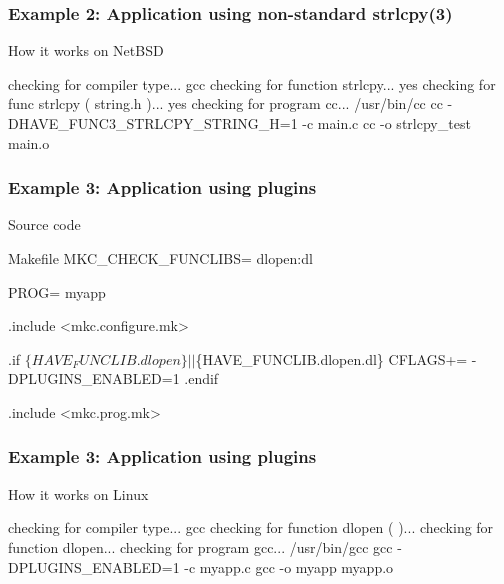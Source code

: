 \documentclass[hyperref={colorlinks=true}]{beamer}
\begin{document}
\begin{frame}[fragile]
  \frametitle{Example 2: Application using non-standard strlcpy(3)}

  \begin{block}{How it works on NetBSD}
\begin{CodeNoLabel}
checking for compiler type... gcc
checking for function strlcpy... yes
checking for func strlcpy ( string.h )... yes
checking for program cc... /usr/bin/cc
cc  -DHAVE_FUNC3_STRLCPY_STRING_H=1    -c main.c
cc   -o strlcpy_test main.o
\prompt{\$} 
\end{CodeNoLabel}
  \end{block}
\end{frame}

\begin{frame}[fragile]
  \frametitle{Example 3: Application using plugins}

  \begin{block}{Source code}
  \begin{Code}{Makefile}
MKC_CHECK_FUNCLIBS=     dlopen:dl

PROG=                   myapp

.include <mkc.configure.mk>

.if $\{HAVE_FUNCLIB.dlopen\} || $\{HAVE_FUNCLIB.dlopen.dl\}
CFLAGS+=	-DPLUGINS_ENABLED=1
.endif

.include <mkc.prog.mk>
  \end{Code}
  \end{block}
\end{frame}

\begin{frame}[fragile]
  \frametitle{Example 3: Application using plugins}

  \begin{block}{How it works on Linux}
\begin{CodeNoLabel}
checking for compiler type... gcc
checking for function dlopen (  )... 
checking for function dlopen... 
checking for program gcc... /usr/bin/gcc
gcc -DPLUGINS_ENABLED=1    -c myapp.c
gcc   -o myapp myapp.o 
\prompt{\$}
\end{CodeNoLabel}
  \end{block}
\end{frame}
\end{document}
